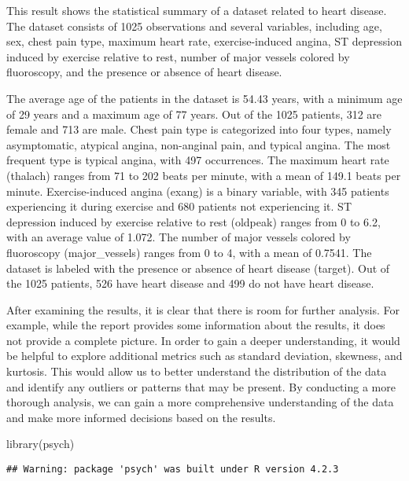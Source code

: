 \documentclass[
]{article}
\newenvironment{Shaded}{\begin{snugshade}}{\end{snugshade}}
\newcommand{\FunctionTok}[1]{\textcolor[rgb]{0.00,0.00,0.00}{#1}}
\newcommand{\NormalTok}[1]{#1}
\begin{document}
This result shows the statistical summary of a dataset related to heart
disease. The dataset consists of 1025 observations and several
variables, including age, sex, chest pain type, maximum heart rate,
exercise-induced angina, ST depression induced by exercise relative to
rest, number of major vessels colored by fluoroscopy, and the presence
or absence of heart disease.

The average age of the patients in the dataset is 54.43 years, with a
minimum age of 29 years and a maximum age of 77 years. Out of the 1025
patients, 312 are female and 713 are male. Chest pain type is
categorized into four types, namely asymptomatic, atypical angina,
non-anginal pain, and typical angina. The most frequent type is typical
angina, with 497 occurrences. The maximum heart rate (thalach) ranges
from 71 to 202 beats per minute, with a mean of 149.1 beats per minute.
Exercise-induced angina (exang) is a binary variable, with 345 patients
experiencing it during exercise and 680 patients not experiencing it. ST
depression induced by exercise relative to rest (oldpeak) ranges from 0
to 6.2, with an average value of 1.072. The number of major vessels
colored by fluoroscopy (major\_vessels) ranges from 0 to 4, with a mean
of 0.7541. The dataset is labeled with the presence or absence of heart
disease (target). Out of the 1025 patients, 526 have heart disease and
499 do not have heart disease.

After examining the results, it is clear that there is room for further
analysis. For example, while the report provides some information about
the results, it does not provide a complete picture. In order to gain a
deeper understanding, it would be helpful to explore additional metrics
such as standard deviation, skewness, and kurtosis. This would allow us
to better understand the distribution of the data and identify any
outliers or patterns that may be present. By conducting a more thorough
analysis, we can gain a more comprehensive understanding of the data and
make more informed decisions based on the results.

\begin{Shaded}
\begin{Highlighting}[]
\FunctionTok{library}\NormalTok{(psych)}
\end{Highlighting}
\end{Shaded}

\begin{verbatim}
## Warning: package 'psych' was built under R version 4.2.3
\end{verbatim}
\end{document}
